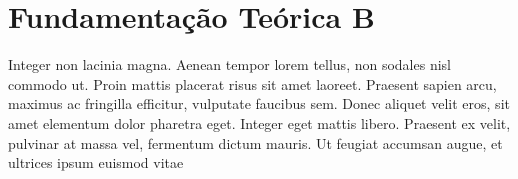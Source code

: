 	
	\begin{figure}[h!]
		\centering
		
	\end{figure}
	
		\begin{figure}[h!]
		\centering
	\end{figure}
	



\section{Fundamentação Teórica B}
\label{sec:fundamentacao-teorica-b}

Integer non lacinia magna. Aenean tempor lorem tellus, non sodales nisl commodo ut. Proin mattis placerat risus sit amet laoreet. Praesent sapien arcu, maximus ac fringilla efficitur, vulputate faucibus sem. Donec aliquet velit eros, sit amet elementum dolor pharetra eget. Integer eget mattis libero. Praesent ex velit, pulvinar at massa vel, fermentum dictum mauris. Ut feugiat accumsan augue, et ultrices ipsum euismod vitae


